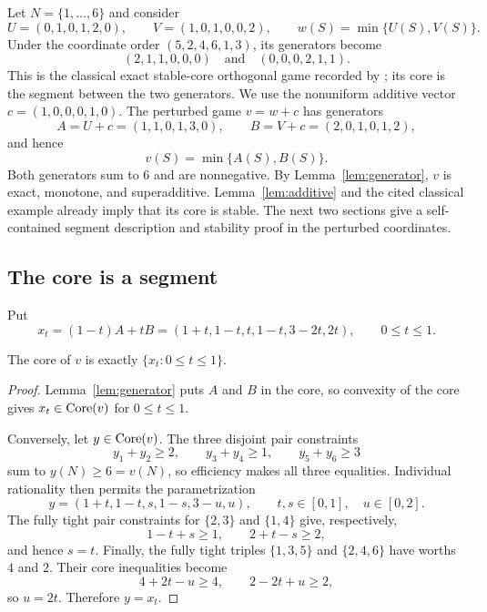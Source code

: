 Let $N=\{1,\dots,6\}$ and consider
\[
 U=(0,1,0,1,2,0),\qquad V=(1,0,1,0,0,2),\qquad
 w(S)=\min\{U(S),V(S)\}.
\]
Under the coordinate order $(5,2,4,6,1,3)$, its generators become
\[
 (2,1,1,0,0,0)\quad\text{and}\quad(0,0,0,2,1,1).
\]
This is the classical exact stable-core orthogonal game recorded by
\citet[][Example~4.3]{Shellshear2009}; its core is the segment between the
two generators. We use the nonuniform additive vector
$c=(1,0,0,0,1,0)$. The perturbed game $v=w+c$ has generators
\[
 A=U+c=(1,1,0,1,3,0),\qquad
 B=V+c=(2,0,1,0,1,2),
\]
and hence
\begin{equation}\label{eq:game}
 v(S)=\min\{A(S),B(S)\}.
\end{equation}
Both generators sum to $6$ and are nonnegative. By
Lemma~\ref{lem:generator}, $v$ is exact, monotone, and superadditive.
Lemma~\ref{lem:additive} and the cited classical example already imply that
its core is stable. The next two sections give a self-contained segment
description and stability proof in the perturbed coordinates.

\subsection{The core is a segment}

Put
\begin{equation}\label{eq:xt}
 x_t=(1-t)A+tB
     =(1+t,1-t,t,1-t,3-2t,2t),
 \qquad 0\le t\le1.
\end{equation}

\begin{proposition}\label{prop:core}
The core of $v$ is exactly $\{x_t:0\le t\le1\}$.
\end{proposition}

\begin{proof}
Lemma~\ref{lem:generator} puts $A$ and $B$ in the core, so convexity of the
core gives $x_t\in\operatorname{Core}(v)$ for $0\le t\le1$.

Conversely, let $y\in\operatorname{Core}(v)$. The three disjoint pair constraints
\[
 y_1+y_2\ge2,\qquad y_3+y_4\ge1,\qquad y_5+y_6\ge3
\]
sum to $y(N)\ge6=v(N)$, so efficiency makes all three equalities. Individual
rationality then permits the parametrization
\[
 y=(1+t,1-t,s,1-s,3-u,u),
 \qquad t,s\in[0,1],\quad u\in[0,2].
\]
The fully tight pair constraints for $\{2,3\}$ and $\{1,4\}$ give,
respectively,
\[
 1-t+s\ge1,\qquad 2+t-s\ge2,
\]
and hence $s=t$. Finally, the fully tight triples $\{1,3,5\}$ and
$\{2,4,6\}$ have worths $4$ and $2$. Their core inequalities become
\[
 4+2t-u\ge4,\qquad 2-2t+u\ge2,
\]
so $u=2t$. Therefore $y=x_t$.
\end{proof}

